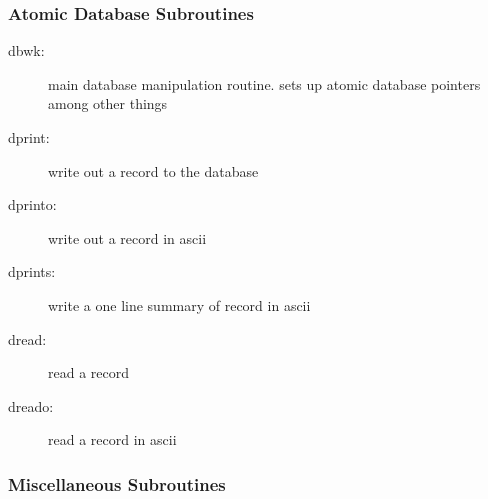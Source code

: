 \subsubsection {Atomic Database Subroutines}

\begin{description}

\item[dbwk:] main database manipulation routine. 
sets up atomic database pointers among other things

\item[dprint:] write out a record to the database

\item[dprinto:] write out a record in ascii

\item[dprints:] write a one line summary of record in ascii

\item[dread:] read a record

\item[dreado:] read a record in ascii


\end{description}

\subsubsection {Miscellaneous Subroutines}

